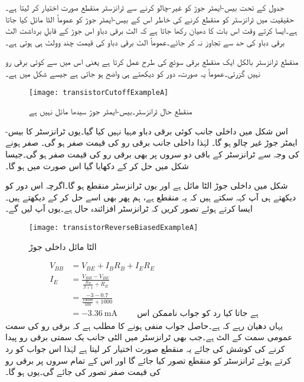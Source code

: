	جدول کے تحت بیس-ایمٹر  جوڑ کو غیر-چالو کرنے سے ٹرانزسٹر منقطع صورت اختیار کر لیتا ہے۔حقیقیت میں ٹرانزسٹر کو منقطع کرنے کی خاطر اس کے بیس-ایمٹر  جوڑ کو عموماً الٹا مائل کیا جاتا ہے۔ایسا کرتے وقت اس بات کا دھیان رکھا جاتا ہے کہ الٹ برقی دباو اس جوڑ کے قابلِ برداشت الٹ برقی دباو  کی حد سے تجاوز نہ کر جائے۔عموماً الٹ برقی دباو کی قیمت چند وولٹ  ہی ہوتی ہے۔ 

منقطع ٹرانزسٹر بالکل ایک منقطع برقی سوئچ کی طرح عمل کرتا ہے یعنی اس میں سے  کوئی برقی رو نہیں گزرتی۔عموماً یہ صورت، دور کو دیکھتے ہی واضح ہو جاتی ہے جیسے شکل  میں ہے۔
\begin{figure}
\centering
\texttt{[image: transistorCutoffExampleA]}
\caption{منقطع حال ٹرانزسٹر۔بیس-ایمٹر  جوڑ سیدھا مائل نہیں ہے}
\label{شکل_منقطع_ٹرانزسٹر_کی_مثال}
\end{figure}
اس شکل میں داخلی جانب کوئی برقی دباو مہیا نہیں کیا گیا۔یوں ٹرانزسٹر کا بیس-ایمٹر  جوڑ غیر چالو ہو گا۔ لہٰذا داخلی جانب برقی رو  کی قیمت صفر ہو گی۔  صفر ہونے کی وجہ سے ٹرانزسٹر کے باقی دو سروں پر بھی برقی رو کی قیمت صفر ہو گی۔جیسا شکل میں حل کر کے دکھایا گیا اس صورت میں  ہو گا۔

شکل   میں داخلی جوڑ الٹا مائل ہے اور یوں ٹرانزسٹر منقطع ہو گا۔اگرچہ اس دور کو دیکھتے ہی آپ کہہ سکتے ہیں کہ یہ منقطع ہے، ہم پھر بھی اسے حل کر کے دیکھتے ہیں۔ایسا کرتے ہوئے تصور کریں کہ ٹرانزسٹر افزائندہ حال ہے۔یوں آپ  لیں گے۔
\begin{figure}
\centering
\texttt{[image: transistorReverseBiasedExampleA]}
\caption{ الٹا مائل داخلی جوڑ}
\label{شکل_الٹا_مائل_داخلی_جوڑ}
\end{figure}
%
\begin{align*}
V_{BB}&=V_{BE}+I_B R_B +I_E R_E\\
I_E &=\frac{V_{BB}-V_{BE}}{\frac{R_B}{\beta+1}+R_E}\\
&=\frac{-3-0.7}{\frac{10000}{100}+1000}\\
&=\SI{-3.36}{\milli \ampere} \hspace{1cm} \textrm{ہے جاتا کیا رد کو جواب ناممکن اس}
\end{align*}
یہاں دھیان رہے کہ  ہے۔حاصل جواب منفی ہونے کا مطلب ہے کہ برقی رو کی سمت عمومی سمت کے الٹ ہے۔جب بھی ٹرانزسٹر میں الٹی جانب یک سمتی برقی رو پیدا کرنے کی کوشش کی جائے یہ منقطع صورت اختیار کر لیتا ہے لہٰذا اس جواب کو رد کرتے ہوئے ٹرانزسٹر کو منقطع تصور کیا جائے گا اور اس کے تمام سروں پر برقی رو کی قیمت صفر تصور کی جائے گی۔یوں  ہو گا۔

